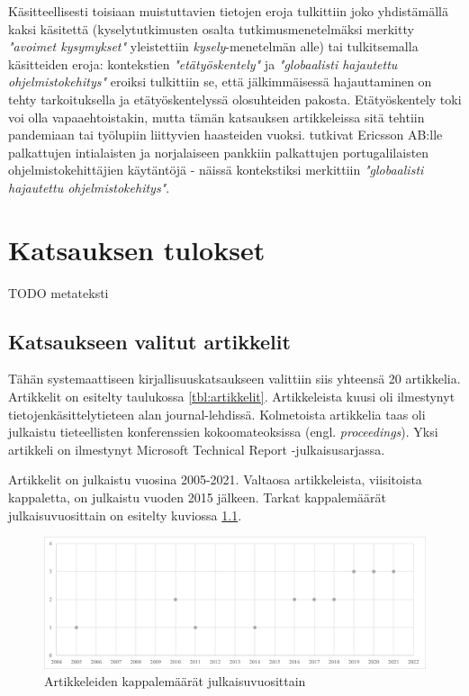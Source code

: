 \documentclass[utf8]{gradu3}
\begin{document}
Käsitteellisesti toisiaan muistuttavien tietojen eroja tulkittiin joko yhdistämällä kaksi käsitettä (kyselytutkimusten osalta tutkimusmenetelmäksi merkitty \textit{"avoimet kysymykset"} yleistettiin \textit{kysely}-menetelmän alle) tai tulkitsemalla käsitteiden eroja: kontekstien \textit{"etätyöskentely"} ja \textit{"globaalisti hajautettu ohjelmistokehitys"} eroiksi tulkittiin se, että jälkimmäisessä hajauttaminen on tehty tarkoituksella ja etätyöskentelyssä olosuhteiden pakosta. Etätyöskentely toki voi olla vapaaehtoistakin, mutta tämän katsauksen artikkeleissa sitä tehtiin pandemiaan \textcite{rodeghero-ym-2021} tai työlupiin \textcite{hemphill-begel-2011} liittyvien haasteiden vuoksi. \textcite{britto-ym-2020} tutkivat Ericsson AB:lle palkattujen intialaisten ja \textcite{moe-ym-2020} norjalaiseen pankkiin palkattujen portugalilaisten ohjelmistokehittäjien käytäntöjä - näissä kontekstiksi merkittiin \textit{"globaalisti hajautettu ohjelmistokehitys"}.

\chapter{Katsauksen tulokset}

TODO metateksti

\section{Katsaukseen valitut artikkelit}

Tähän systemaattiseen kirjallisuuskatsaukseen valittiin siis yhteensä 20 artikkelia. Artikkelit on esitelty taulukossa \ref{tbl:artikkelit}. Artikkeleista kuusi oli ilmestynyt tietojenkäsittelytieteen alan journal-lehdissä. Kolmetoista artikkelia taas oli julkaistu tieteellisten konferenssien kokoomateoksissa (engl. \textit{proceedings}). Yksi artikkeli \parencite{hemphill-begel-2011} on ilmestynyt Microsoft Technical Report -julkaisusarjassa. 

Artikkelit on julkaistu vuosina 2005-2021. Valtaosa artikkeleista, viisitoista kappaletta, on julkaistu vuoden 2015 jälkeen. Tarkat kappalemäärät julkaisuvuosittain on esitelty kuviossa \ref{kuvio:kappalemaarat-julkaisuvuosittain}.

\begin{figure}[h]
    \centering
    \includegraphics[width=\textwidth]{media/kappalemaarat-julkaisuvuosittain.png}
    \caption{Artikkeleiden kappalemäärät julkaisuvuosittain}
    \label{kuvio:kappalemaarat-julkaisuvuosittain}
\end{figure}
\end{document}

